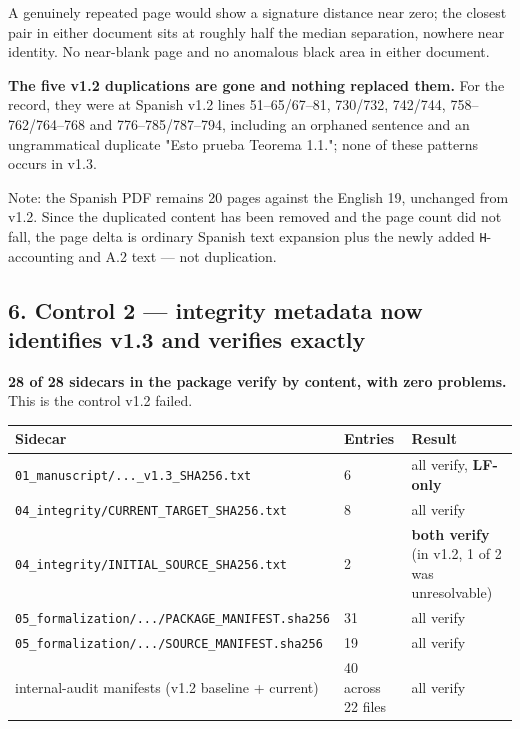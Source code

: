 \documentclass[
  9pt,
  a4paper,
]{article}
\newcounter{none} %
\begin{document}
A genuinely repeated page would show a signature distance near zero; the
closest pair in either document sits at roughly half the median
separation, nowhere near identity. No near-blank page and no anomalous
black area in either document.

\textbf{The five v1.2 duplications are gone and nothing replaced them.}
For the record, they were at Spanish v1.2 lines 51--65/67--81, 730/732,
742/744, 758--762/764--768 and 776--785/787--794, including an orphaned
sentence and an ungrammatical duplicate "Esto prueba Teorema 1.1."; none
of these patterns occurs in v1.3.

Note: the Spanish PDF remains 20 pages against the English 19, unchanged
from v1.2. Since the duplicated content has been removed and the page
count did not fall, the page delta is ordinary Spanish text expansion
plus the newly added \texttt{H}-accounting and A.2 text --- not
duplication.

\subsection{6. Control 2 --- integrity metadata now identifies v1.3 and
verifies
exactly}\label{6-control-2--integrity-metadata-now-identifies-v13-and-verifies-exactly}

\textbf{28 of 28 sidecars in the package verify by content, with zero
problems.} This is the control v1.2 failed.

{\def\LTcaptype{none} %
\begin{longtable}[]{@{}lll@{}}
\toprule\noalign{}
Sidecar & Entries & Result \\
\midrule\noalign{}
\endhead
\bottomrule\noalign{}
\endlastfoot
\texttt{01\_manuscript/...\_v1.3\_SHA256.txt} & 6 & all verify,
\textbf{LF-only} \\
\texttt{04\_integrity/CURRENT\_TARGET\_SHA256.txt} & 8 & all verify \\
\texttt{04\_integrity/INITIAL\_SOURCE\_SHA256.txt} & 2 & \textbf{both
verify} (in v1.2, 1 of 2 was unresolvable) \\
\texttt{05\_formalization/.../PACKAGE\_MANIFEST.sha256} & 31 & all
verify \\
\texttt{05\_formalization/.../SOURCE\_MANIFEST.sha256} & 19 & all
verify \\
internal-audit manifests (v1.2 baseline + current) & 40 across 22 files
& all verify \\
\end{longtable}
}
\end{document}
